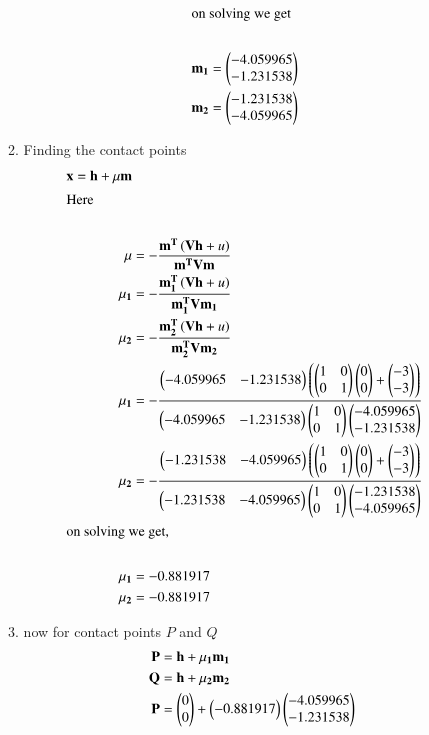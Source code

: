 \begin{enumerate}[label=\thesection.\arabic*,ref=\thesection.\theenumi]
\begin{enumerate}
\begin{align}
\intertext{on solving  we get  }   \nonumber \\ 
	\mathbf{m_1} &=\begin{pmatrix}-4.059965 \\ -1.231538 \end{pmatrix} \\
	\mathbf{m_2} &=\begin{pmatrix}-1.231538 \\ -4.059965 \end{pmatrix} 
\end{align}
%
\item Finding  the contact points 
	\begin{align}
		\mathbf{x}=\mathbf{h}+\mathbf{\mu}\mathbf{m} \\
\intertext{Here  }   \nonumber \\
		\mathbf{\mu} &=-\frac{\mathbf{m^T}\left(\mathbf{V}\mathbf{h}+u\right)}{\mathbf{m^T}\mathbf{V}\mathbf{m}}  \\
		\mathbf{\mu_1} &=-\frac{\mathbf{m_1^T}\left(\mathbf{V}\mathbf{h}+u\right)}{\mathbf{m_1^T}\mathbf{V}\mathbf{m_1}} \\
		\mathbf{\mu_2} &=-\frac{\mathbf{m_2^T}\left(\mathbf{V}\mathbf{h}+u\right)}{\mathbf{m_2^T}\mathbf{V}\mathbf{m_2}} \\
		\mathbf{\mu_1} &=-\frac{ \begin{pmatrix} -4.059965 & -1.231538\end{pmatrix}\left(\begin{pmatrix}1 &0 \\0 &1\end{pmatrix}\begin{pmatrix}0 \\0\end{pmatrix}+\begin{pmatrix}-3 \\-3\end{pmatrix}\right)}{\begin{pmatrix}-4.059965 & -1.231538\end{pmatrix} \begin{pmatrix}1 &0 \\ 0 & 1\end{pmatrix}\begin{pmatrix}-4.059965 \\ -1.231538\end{pmatrix}} \\
		\mathbf{\mu_2} &=-\frac{ \begin{pmatrix} -1.231538 & -4.059965\end{pmatrix}\left(\begin{pmatrix}1 &0 \\0 &1\end{pmatrix}\begin{pmatrix}0 \\0\end{pmatrix}+\begin{pmatrix}-3 \\-3\end{pmatrix}\right)}{\begin{pmatrix}-1.231538 & -4.059965\end{pmatrix} \begin{pmatrix}1 &0 \\ 0 & 1\end{pmatrix}\begin{pmatrix}-1.231538 \\ -4.059965\end{pmatrix}} \\
\intertext{on solving we get, }   \nonumber \\
		\mathbf{\mu_1} &=-0.881917 \\
		\mathbf{\mu_2} &=-0.881917
	\end{align}
%
\item now for contact points $P$ and $Q$
	\begin{align}
		\vec{P} &=\vec{h}+\vec{\mu_1}\vec{m_1} \\
		\vec{Q} &=\vec{h}+\vec{\mu_2}\vec{m_2} \\
		\vec{P} &=\myvec{0 \\0}+\myvec{-0.881917}\myvec{-4.059965 \\ -1.231538} \\

\end{align}
\end{enumerate}
\end{enumerate}
